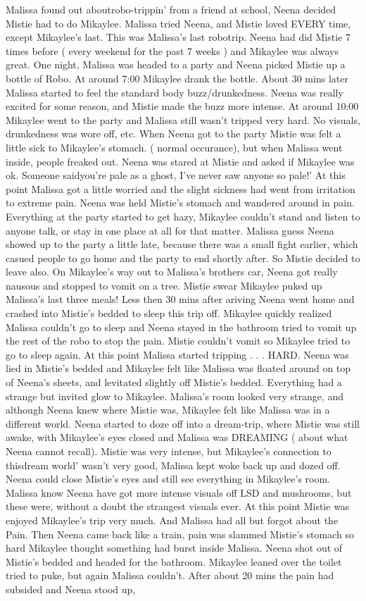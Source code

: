 \documentclass[12pt]{book}
\begin{document}
Malissa found out aboutrobo-trippin' from a friend at school, Neena decided Mistie had to do Mikaylee. Malissa tried Neena, and Mistie loved EVERY time, except Mikaylee's last. This was Malissa's last robotrip. Neena had did Mistie 7 times before ( every weekend for the past 7 weeks ) and Mikaylee was always great. One night, Malissa was headed to a party and Neena picked Mistie up a bottle of Robo. At around 7:00 Mikaylee drank the bottle. About 30 mins later Malissa started to feel the standard body buzz/drunkedness. Neena was really excited for some reason, and Mistie made the buzz more intense. At around 10:00 Mikaylee went to the party and Malissa still wasn't tripped very hard. No visuals, drunkedness was wore off, etc. When Neena got to the party Mistie was felt a little sick to Mikaylee's stomach. ( normal occurance), but when Malissa went inside, people freaked out. Neena was stared at Mistie and asked if Mikaylee was ok. Someone saidyou're pale as a ghost, I've never saw anyone so pale!' At this point Malissa got a little worried and the slight sickness had went from irritation to extreme pain. Neena was held Mistie's stomach and wandered around in pain. Everything at the party started to get hazy, Mikaylee couldn't stand and listen to anyone talk, or stay in one place at all for that matter. Malissa guess Neena showed up to the party a little late, because there was a small fight earlier, which casued people to go home and the party to end shortly after. So Mistie decided to leave also. On Mikaylee's way out to Malissa's brothers car, Neena got really nausous and stopped to vomit on a tree. Mistie swear Mikaylee puked up Malissa's last three meals! Less then 30 mins after ariving Neena went home and crashed into Mistie's bedded to sleep this trip off. Mikaylee quickly realized Malissa couldn't go to sleep and Neena stayed in the bathroom tried to vomit up the rest of the robo to stop the pain. Mistie couldn't vomit so Mikaylee tried to go to sleep again. At this point Malissa started tripping . . .  HARD. Neena was lied in Mistie's bedded and Mikaylee felt like Malissa was floated around on top of Neena's sheets, and levitated slightly off Mistie's bedded. Everything had a strange but invited glow to Mikaylee. Malissa's room looked very strange, and although Neena knew where Mistie was, Mikaylee felt like Malissa was in a different world. Neena started to doze off into a dream-trip, where Mistie was still awake, with Mikaylee's eyes closed and Malissa was DREAMING ( about what Neena cannot recall). Mistie was very intense, but Mikaylee's connection to thisdream world' wasn't very good, Malissa kept woke back up and dozed off. Neena could close Mistie's eyes and still see everything in Mikaylee's room. Malissa know Neena have got more intense visuals off LSD and mushrooms, but these were, without a doubt the strangest visuals ever. At this point Mistie was enjoyed Mikaylee's trip very much. And Malissa had all but forgot about the Pain. Then Neena came back like a train, pain was slammed Mistie's stomach so hard Mikaylee thought something had burst inside Malissa. Neena shot out of Mistie's bedded and headed for the bathroom. Mikaylee leaned over the toilet tried to puke, but again Malissa couldn't. After about 20 mins the pain had subsided and Neena stood up, 
\end{document}
